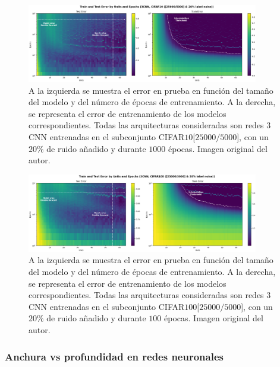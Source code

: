 \begin{figure}[h]
    \centering
    \includegraphics[width=0.9\textwidth]{img/experiments/model-epoch3CNNCIFAR10.png}
    \caption[Doble descenso en función del tamaño del modelo y del número de épocas para la red $3$CNN y un subconjunto de CIFAR$10$.]{A la izquierda se muestra el error en prueba en función del tamaño del modelo y del número de épocas de entrenamiento. A la derecha, se representa el error de entrenamiento de los modelos correspondientes. Todas las arquitecturas consideradas son redes $3$CNN entrenadas en el subconjunto CIFAR$10$[$25000/5000$], con un $20\%$ de ruido añadido y durante $1000$ épocas. Imagen original del autor.}\label{fig:model-epoch3CNNCIFAR10}
\end{figure}

\begin{figure}[h]
    \centering
    \includegraphics[width=0.9\textwidth]{img/experiments/model-epoch3CNNCIFAR10025k.png}
    \caption[Doble descenso en función del tamaño del modelo y del número de épocas para la red $3$CNN y un subconjunto de CIFAR$100$.]{A la izquierda se muestra el error en prueba en función del tamaño del modelo y del número de épocas de entrenamiento. A la derecha, se representa el error de entrenamiento de los modelos correspondientes. Todas las arquitecturas consideradas son redes $3$CNN entrenadas en el subconjunto CIFAR$100$[$25000/5000$], con un $20\%$ de ruido añadido y durante $100$ épocas. Imagen original del autor.}\label{fig:model-epoch3CNNCIFAR10025k}
\end{figure}

\subsubsection{Anchura vs profundidad en redes neuronales}\label{subsubsec:anchura-produnfidad}

